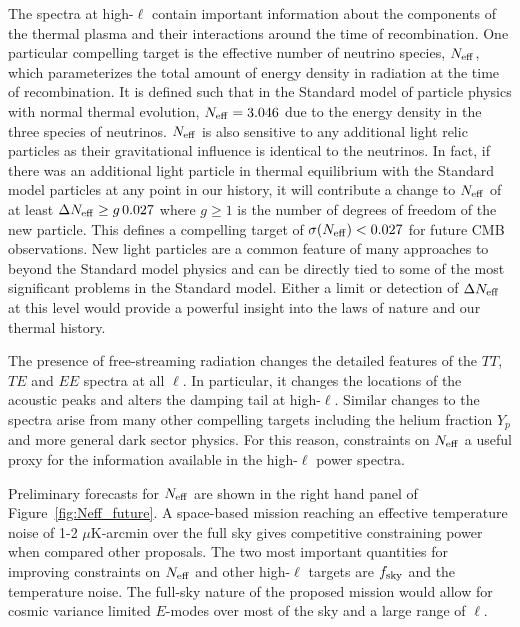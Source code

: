 The spectra at high-$\ell$ contain important information about the components of the thermal plasma and their interactions around the time of recombination.  One particular compelling target is the effective number of neutrino species, ${N_{\rm eff}}$, which parameterizes the total amount of energy density in radiation at the time of recombination.  It is defined such that in the Standard model of particle physics with normal thermal evolution, ${N_{\rm eff}} = 3.046$ due to the energy density in the three species of neutrinos.  ${N_{\rm eff}}$ is also sensitive to any additional light relic particles as their gravitational influence is identical to the neutrinos.  In fact, if there was an additional light particle in thermal equilibrium with the Standard model particles at any point in our history, it will contribute a change to ${N_{\rm eff}}$ of at least $\Delta {N_{\rm eff}} \geq g \, 0.027$ where $g \geq 1$ is the number of degrees of freedom of the new particle.  This defines a compelling target of $\sigma({N_{\rm eff}}) < 0.027$ for future CMB observations.  New light particles are a common feature of many approaches to beyond the Standard model physics and can be directly tied to some of the most significant problems in the Standard model.  Either a limit or detection of $\Delta {N_{\rm eff}}$ at this level would provide a powerful insight into the laws of nature and our thermal history. 

The presence of free-streaming radiation changes the detailed features of the $TT$, $TE$ and $EE$ spectra at all $\ell$.  In particular, it changes the locations of the acoustic peaks and alters the damping tail at high-$\ell$.  Similar changes to the spectra arise from many other compelling targets including the helium fraction $Y_p$ and more general dark sector physics.  For this reason, constraints on ${N_{\rm eff}}$ a useful proxy for the information available in the high-$\ell$ power spectra.  

Preliminary forecasts for ${N_{\rm eff}}$ are shown in the right hand panel of Figure~\ref{fig:Neff_future}.  A space-based mission reaching an effective temperature noise of 1-2 $\mu$K-arcmin over the full sky gives competitive constraining power when compared other proposals.  The two most important quantities for improving constraints on ${N_{\rm eff}}$ and other high-$\ell$ targets are $f_{\rm sky}$ and the temperature noise.  The full-sky nature of the proposed mission would allow for cosmic variance limited $E$-modes over most of the sky and a large range of $\ell$.

